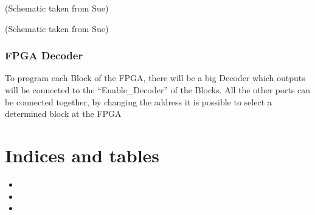 \documentclass[letterpaper,10pt,english]{sphinxmanual}
\begin{document}
\noindent{}

(Schematic taken from Sue)

\noindent{}

(Schematic taken from Sue)


\subsection{FPGA Decoder}
\label{fpgadecoder::doc}\label{fpgadecoder:fpga-decoder}
To program each Block of the FPGA, there will be a big Decoder which outputs will be connected to the ``Enable\_Decoder'' of the Blocks. All the other ports can be connected together, by changing the address it is possible to select a determined block at the FPGA

\noindent{}


\chapter{Indices and tables}
\label{index:indices-and-tables}\begin{itemize}
\item {} 

\item {} 

\item {} 

\end{itemize}



\renewcommand{\indexname}{Index}
\printindex
\end{document}
